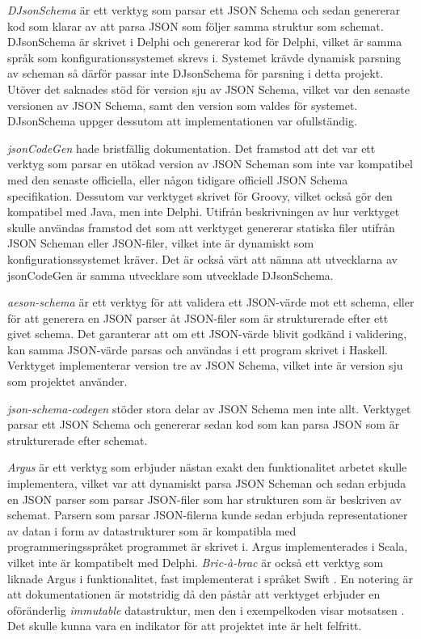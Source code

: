 \textit{DJsonSchema} är ett verktyg som parsar ett JSON Schema och sedan genererar kod som klarar av att parsa JSON som följer samma struktur som schemat. DJsonSchema är skrivet i Delphi och genererar kod för Delphi, vilket är samma språk som konfigurationssystemet skrevs i. Systemet krävde dynamisk parsning av scheman så därför passar inte DJsonSchema för parsning i detta projekt. Utöver det saknades stöd för version sju av JSON Schema, vilket var den senaste versionen av JSON Schema, samt den version som valdes för systemet. DJsonSchema uppger dessutom att implementationen var ofullständig. \cite{Schlothauer&WauerGmbH}

\textit{jsonCodeGen} hade bristfällig dokumentation. Det framstod att det var ett verktyg som parsar en utökad version av JSON Scheman som inte var kompatibel med den senaste officiella, eller någon tidigare officiell JSON Schema specifikation. Dessutom var verktyget skrivet för Groovy, vilket också gör den kompatibel med Java, men inte Delphi. Utifrån beskrivningen av hur verktyget skulle användas framstod det som att verktyget genererar statiska filer utifrån JSON Scheman eller JSON-filer, vilket inte är dynamiskt som konfigurationssystemet kräver. Det är också värt att nämna att utvecklarna av jsonCodeGen är samma utvecklare som utvecklade DJsonSchema. \cite{Schlothauer&WauerGmbHa} 

\textit{aeson-schema} är ett verktyg för att validera ett JSON-värde mot ett schema, eller för att generera en JSON parser åt JSON-filer som är strukturerade efter ett givet schema. Det garanterar att om ett JSON-värde blivit godkänd i validering, kan samma JSON-värde parsas och användas i ett program skrivet i Haskell. Verktyget implementerar version tre av JSON Schema, vilket inte är version sju som projektet använder. \cite{Kowalczyk}

\textit{json-schema-codegen} stöder stora delar av JSON Schema men inte allt. Verktyget parsar ett JSON Schema och genererar sedan kod som kan parsa JSON som är strukturerade efter schemat. \cite{Tundra}

\textit{Argus} är ett verktyg som erbjuder nästan exakt den funktionalitet arbetet skulle implementera, vilket var att dynamiskt parsa JSON Scheman och sedan erbjuda en JSON parser som parsar JSON-filer som har strukturen som är beskriven av schemat. Parsern som parsar JSON-filerna kunde sedan erbjuda representationer av datan i form av datastrukturer som är kompatibla med programmeringsspråket programmet är skrivet i. Argus implementerades i Scala, vilket inte är kompatibelt med Delphi. \cite{Fenton} \textit{Bric-à-brac} är också ett verktyg som liknade Argus i funktionalitet, fast implementerat i språket Swift \cite{GlimpseI/OInc}. En notering är att dokumentationen är motstridig då den påstår att verktyget erbjuder en oföränderlig \textit{immutable} datastruktur, men den i exempelkoden visar motsatsen \cite{GlimpseI/OInc}. Det skulle kunna vara en indikator för att projektet inte är helt felfritt.

